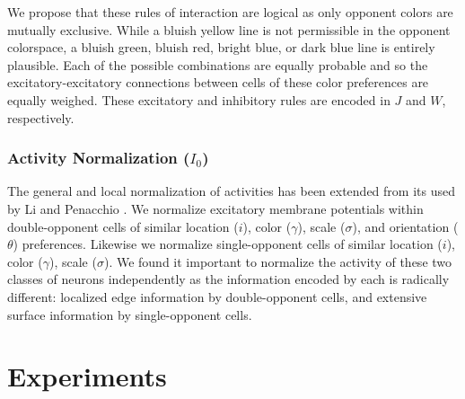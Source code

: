 \documentclass[journal,onecolumn]{IEEEtran}
\begin{document}
We propose that these rules of interaction are logical as only opponent colors are mutually exclusive. While a bluish yellow line is not permissible in the opponent colorspace, a bluish green, bluish red, bright blue, or dark blue line is entirely plausible. Each of the possible combinations are equally probable and so the excitatory-excitatory connections between cells of these color preferences are equally weighed. These excitatory and inhibitory rules are encoded in $J$ and $W$, respectively.

\subsubsection*{Activity Normalization ($I_0$)}
The general and local normalization of activities \cite{heeger:1992} has been extended from its used by Li \cite{li:1999} and Penacchio \cite{penacchio:2013}. We normalize excitatory membrane potentials within double-opponent cells of similar location ($i$), color ($\gamma$), scale ($\sigma$), and orientation ($\theta$) preferences. Likewise we normalize single-opponent cells of similar location ($i$), color ($\gamma$), scale ($\sigma$). We found it important to normalize the activity of these two classes of neurons independently as the information encoded by each is radically different: localized edge information by double-opponent cells, and extensive surface information by single-opponent cells.


%
%
%
\section{Experiments}
\end{document}
